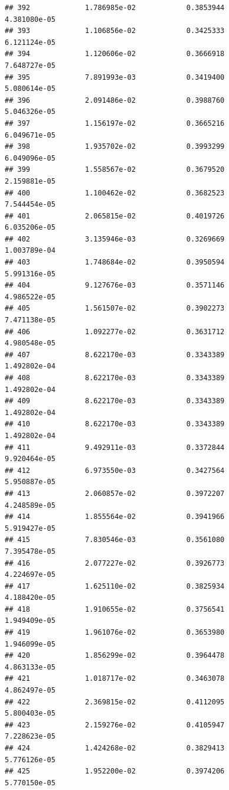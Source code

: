 \documentclass[
]{article}
\begin{document}
\begin{verbatim}
## 392             1.786985e-02            0.3853944            4.381080e-05
## 393             1.106856e-02            0.3425333            6.121124e-05
## 394             1.120606e-02            0.3666918            7.648727e-05
## 395             7.891993e-03            0.3419400            5.080614e-05
## 396             2.091486e-02            0.3988760            5.046326e-05
## 397             1.156197e-02            0.3665216            6.049671e-05
## 398             1.935702e-02            0.3993299            6.049096e-05
## 399             1.558567e-02            0.3679520            2.159881e-05
## 400             1.100462e-02            0.3682523            7.544454e-05
## 401             2.065815e-02            0.4019726            6.035206e-05
## 402             3.135946e-03            0.3269669            1.003789e-04
## 403             1.748684e-02            0.3950594            5.991316e-05
## 404             9.127676e-03            0.3571146            4.986522e-05
## 405             1.561507e-02            0.3902273            7.471138e-05
## 406             1.092277e-02            0.3631712            4.980548e-05
## 407             8.622170e-03            0.3343389            1.492802e-04
## 408             8.622170e-03            0.3343389            1.492802e-04
## 409             8.622170e-03            0.3343389            1.492802e-04
## 410             8.622170e-03            0.3343389            1.492802e-04
## 411             9.492911e-03            0.3372844            9.920464e-05
## 412             6.973550e-03            0.3427564            5.950887e-05
## 413             2.060857e-02            0.3972207            4.248589e-05
## 414             1.855564e-02            0.3941966            5.919427e-05
## 415             7.830546e-03            0.3561080            7.395478e-05
## 416             2.077227e-02            0.3926773            4.224697e-05
## 417             1.625110e-02            0.3825934            4.188420e-05
## 418             1.910655e-02            0.3756541            1.949409e-05
## 419             1.961076e-02            0.3653980            1.946099e-05
## 420             1.856299e-02            0.3964478            4.863133e-05
## 421             1.018717e-02            0.3463078            4.862497e-05
## 422             2.369815e-02            0.4112095            5.800403e-05
## 423             2.159276e-02            0.4105947            7.228623e-05
## 424             1.424268e-02            0.3829413            5.776126e-05
## 425             1.952200e-02            0.3974206            5.770150e-05

\end{verbatim}
\end{document}
